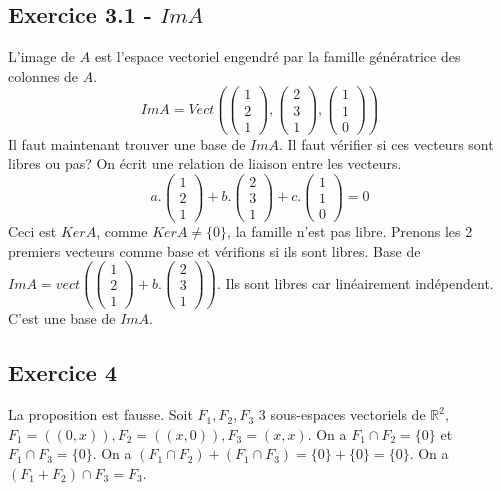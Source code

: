 \documentclass[]{book}
\theoremstyle{definition}
\newcommand{\bb}[1]{\mathbb{#1}}
\newcommand{\R}{\bb{R}}
\begin{document}
\subsection*{Exercice 3.1 - $Im A$}
L'image de $A$ est l'espace vectoriel engendr\'e par la famille g\'en\'eratrice des colonnes de $A$.
$$Im A =  Vect(\begin{pmatrix} 1 \\ 2 \\ 1 \end{pmatrix},\begin{pmatrix} 2 \\ 3 \\ 1 \end{pmatrix},\begin{pmatrix} 1 \\ 1 \\ 0 \end{pmatrix})$$
Il faut maintenant trouver une base de $Im A$.
Il faut v\'erifier si ces vecteurs sont libres ou pas? On \'ecrit une relation de liaison entre les vecteurs.
$$a.\begin{pmatrix}1\\2\\1\end{pmatrix} + b.\begin{pmatrix}2\\3\\1\end{pmatrix} + c.\begin{pmatrix}1\\1\\0\end{pmatrix} = 0$$
Ceci est $Ker A$, comme $Ker A \neq \{0\}$, la famille n'est pas libre. Prenons les 2 premiers vecteurs comme base et v\'erifions si ils sont libres.
Base de $Im A = vect(\begin{pmatrix}1\\2\\1\end{pmatrix} + b.\begin{pmatrix}2\\3\\1\end{pmatrix})$. Ils sont libres car lin\'eairement ind\'ependent. C'est une base de $Im A$.



\subsection*{Exercice 4}
La proposition est fausse. Soit $F_1,F_2,F_3$ 3 sous-espaces vectoriels de $\R^2$, $F_1=((0,x)), F_2=((x,0)), F_3=(x,x)$. On a $F_1 \cap F_2 = \{0\}$ et $F_1 \cap F_3 = \{0\}$. On a $(F_1 \cap F_2) + (F_1 \cap F_3) = \{0\} + \{0\} = \{0\}$. On a $(F_1 + F_2) \cap F_3 = F_3$.
\end{document}
